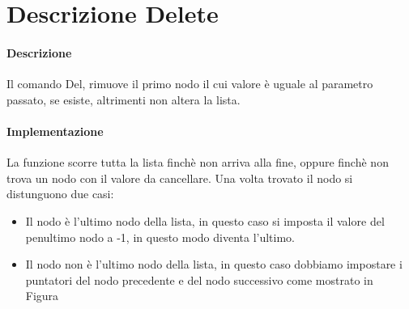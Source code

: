 \section{Descrizione Delete}

\paragraph{Descrizione}
Il comando Del, rimuove il primo nodo il cui valore è uguale al parametro passato,
se esiste, altrimenti non altera la lista.

\paragraph{Implementazione}
La funzione scorre tutta la lista finchè non arriva alla fine, oppure finchè non trova
un nodo con il valore da cancellare. Una volta trovato il nodo si distunguono due casi:
\begin{itemize}
    \item Il nodo è l'ultimo nodo della lista, in questo caso si imposta il valore 
    del penultimo nodo a -1, in questo modo diventa l'ultimo.
    \item Il nodo non è l'ultimo nodo della lista, in questo caso dobbiamo impostare 
    i puntatori del nodo precedente e del nodo successivo come mostrato in Figura~
\end{itemize}